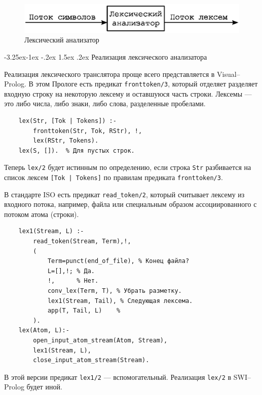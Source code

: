 \documentclass[12pt, openany, twoside]{book} %
\makeatletter
\renewcommand\subsubsection{\@startsection{subsubsection}{3}{\z@}%
                                     {-3.25ex\@plus -1ex \@minus -.2ex}%
                                     {1.5ex \@plus .2ex}%
                                     {\normalfont\normalsize\bfseries}}
\makeatother
\begin{document}
\begin{figure}[htbp]
\begin{center}
\includegraphics[scale=0.7]{pics/lex_anal.eps}
\end{center}
\caption{Лексический анализатор}\label{pic:lex_anal}
\end{figure}

\subsubsection{Реализация лексического анализатора}


Реализация лексического транслятора проще всего представляется в Visual--Prolog. В этом Прологе есть предикат  {\tt fronttoken/3}, который отделяет разделяет входную строку на некоторую лексему и оставшуюся часть строки. Лексемы --- это либо числа, либо знаки, либо слова, разделенные пробелами.
{\tt\begin{verbatim}
    lex(Str, [Tok | Tokens]) :-
        fronttoken(Str, Tok, RStr), !,
        lex(RStr, Tokens).
    lex(S, []).  % Для пустых строк.
\end{verbatim}}
\noindent Теперь {\tt lex/2} будет истинным по определению, если строка {\tt Str} разбивается на список лексем {\tt [Tok | Tokens]} по правилам предиката {\tt fronttoken/3}.

В стандарте ISO есть предикат \texttt{read\_token/2}, который считывает лексему из входного потока, например, файла или специальным образом ассоциированного с потоком атома (строки).
{\tt\begin{verbatim}
    lex1(Stream, L) :-
        read_token(Stream, Term),!,
        (
            Term=punct(end_of_file), % Конец файла?
            L=[],!; % Да.
            !,      % Нет.
            conv_lex(Term, T), % Убрать разметку.
            lex1(Stream, Tail), % Следующая лексема.
            app(T, Tail, L)    %
        ).
    lex(Atom, L):-
        open_input_atom_stream(Atom, Stream),
        lex1(Stream, L),
        close_input_atom_stream(Stream).
\end{verbatim}}
В этой версии предикат \texttt{lex1/2} --- вспомогательный. Реализация \texttt{lex/2} в SWI--Prolog будет иной.
\end{document}
